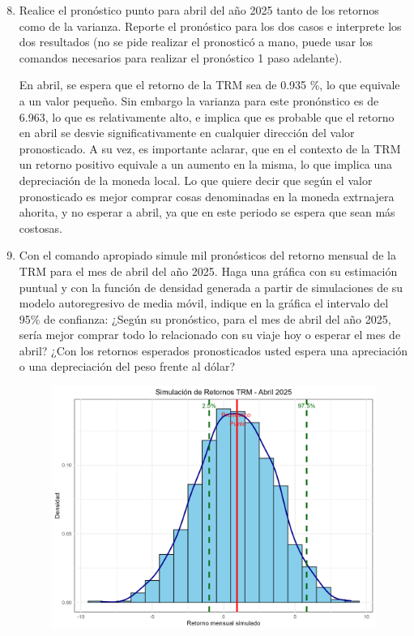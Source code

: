 \documentclass{article}
\theoremstyle{remark}
\theoremstyle{definition}
\begin{document}
\begin{enumerate}[label = \emph{\alph*})]\setcounter{enumi}{7}
    \item {Realice el pron\'ostico punto para abril del año 2025 tanto de los retornos como de la varianza. Reporte el pron\'ostico para los dos casos e interprete los dos resultados (no se pide realizar el pronostic\'o a mano, puede usar los comandos necesarios para realizar el pron\'ostico 1 paso adelante).}
        \begin{tcolorbox}[title=Soluci\'on 2.h]
            

            En abril, se espera que el retorno de la TRM sea de 0.935 \%, lo que equivale a un valor pequeño. Sin embargo la varianza para este pron\'onstico es de 6.963, lo que es relativamente alto, e implica que es probable que el retorno en abril se desvie significativamente en cualquier direcci\'on del valor pronosticado. A su vez, es importante aclarar, que en el contexto de la TRM un retorno positivo equivale a un aumento en la misma, lo que implica una depreciaci\'on de la moneda local. Lo que quiere decir que seg\'un el valor pronosticado es mejor comprar cosas denominadas en la moneda extrnajera ahorita, y no esperar a abril, ya que en este periodo se espera que sean m\'as costosas.
        \end{tcolorbox}
    \item {Con el comando apropiado simule mil pron\'osticos del retorno mensual de la TRM para el mes de abril del año 2025. Haga una gr\'afica con su estimaci\'on puntual y con la funci\'on de densidad generada a partir de simulaciones de su modelo autoregresivo de media m\'ovil, indique en la gr\'afica el intervalo del 95\% de confianza: ¿Seg\'un su pron\'ostico, para el mes de abril del año 2025, ser\'ia mejor comprar todo lo relacionado con su viaje hoy o esperar el mes de abril? ¿Con los retornos esperados pronosticados usted espera una apreciaci\'on o una depreciaci\'on del peso frente al d\'olar?}
        \begin{tcolorbox}[title=Soluci\'on 2.i]
            \begin{figure}[H]
                \centering
                \includegraphics[width=0.9\linewidth]{output/hist_sim.png}

\end{figure}
\end{tcolorbox}
\end{enumerate}
\end{document}
